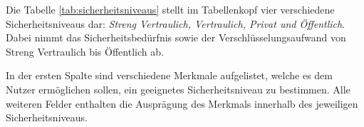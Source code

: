 \documentclass  [paper=a4,
				fontsize=12pt,
				listof=totoc,
				bibliography=totoc
				]{scrreprt}
\begin{document}
		
	
		
		Die Tabelle \ref{tab:sicherheitsniveaus} stellt im Tabellenkopf vier verschiedene Sicherheitsniveaus dar: \textit{Streng Vertraulich, Vertraulich, Privat und Öffentlich}. Dabei nimmt das Sicherheitsbedürfnis sowie der Verschlüsselungsaufwand von Streng Vertraulich bis Öffentlich ab.
		
		In der ersten Spalte sind verschiedene Merkmale aufgelistet, welche es dem Nutzer ermöglichen sollen, 
		ein geeignetes Sicherheitsniveau zu bestimmen.
		Alle weiteren Felder enthalten die Ausprägung des Merkmals innerhalb des jeweiligen Sicherheitsniveaus.
		\medskip\\
		
	\pagebreak
\end{document}

